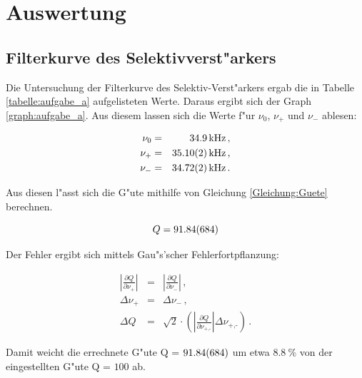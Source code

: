 \section{Auswertung}
	\label{sec:auswertung}

	\subsection{Filterkurve des Selektivverst"arkers} %
	\label{sub:subsection_name}
	
	Die Untersuchung der Filterkurve des Selektiv-Verst"arkers ergab die in Tabelle \ref{tabelle:aufgabe_a} aufgelisteten Werte.
	Daraus ergibt sich der Graph \ref{graph:aufgabe_a}.
	Aus diesem lassen sich die Werte f"ur $\nu_\mathrm{0}$, $\nu_\mathrm{+}$ und $\nu_\mathrm{-}$ ablesen:

	\begin{eqnarray*}
		\nu_\mathrm{0} &=& \SI{34.9}{\kilo\hertz} \, ,\\
		\nu_\mathrm{+} &=& \SI{35.10 (2)}{\kilo\hertz} \, ,\\
		\nu_\mathrm{-} &=& \SI{34.72 (2)}{\kilo\hertz} \, .
	\end{eqnarray*}

	Aus diesen l"asst sich die G"ute mithilfe von Gleichung \eqref{Gleichung:Guete} berechnen.

	\begin{equation*}
		Q = \SI{91.84 (684)}{}
	\end{equation*}

	Der Fehler ergibt sich mittels Gau"s'scher Fehlerfortpflanzung:

	\begin{eqnarray*}
		|\frac{\partial Q}{\partial\nu_\mathrm{+}}| &=& |\frac{\partial Q}{\partial\nu_\mathrm{-}}| \, ,\\
		\Delta \nu_\mathrm{+} &=& \Delta \nu_\mathrm{-} \, ,\\
		\Delta Q &=&  \sqrt{2} \cdot \left( |\frac{\partial Q}{\partial\nu_\text{+,-}}| \Delta \nu_\text{+,-} \right) \, .
	\end{eqnarray*}

	Damit weicht die errechnete G"ute Q = $\SI{91.84 (684)}{}$ um etwa $\SI{8.8}{\%}$ von der eingestellten G"ute Q = $100$ ab.

	

